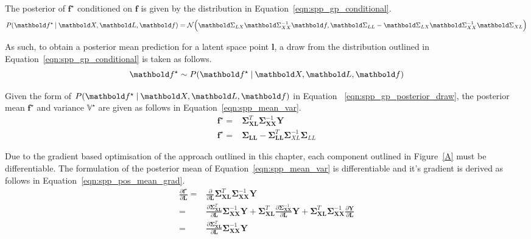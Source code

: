 The posterior of \( \bm{f}^{\star} \) conditioned on \( \bm{f} \) is given by
the distribution in Equation~\ref{eqn:spp_gp_conditional}.
\begin{equation}
  \label{eqn:spp_gp_conditional}
  P(\bm{f}^{\star} \given \bm{X}, \bm{L}, \bm{f}) = 
  \mathcal{N} \Big(
    \bm{\Sigma}_{LX} \bm{\Sigma}_{XX}^{-1} \bm{f}, 
    \bm{\Sigma}_{LL} - \bm{\Sigma}_{LX} \bm{\Sigma}_{XX}^{-1} \bm{\Sigma}_{XL}
  \Big) 
\end{equation}

As such, to obtain a posterior mean prediction for a latent space point \( \bm{l} \), 
a draw from the distribution outlined in Equation~\ref{eqn:spp_gp_conditional} is 
taken as follows.
\begin{equation}
  \label{eqn:spp_gp_posterior_draw}
  \bm{f}^{\star} \sim P(\bm{f}^{\star} \given \bm{X}, \bm{L}, \bm{f})
\end{equation}

Given the form of \( P(\bm{f}^{\star} \given \bm{X}, \bm{L}, \bm{f}) \) in Equation
~\ref{eqn:spp_gp_posterior_draw}, the posterior mean \( \bm{f}^{\star} \) and variance
\( \mathbb{V}^{\star} \) are given as follows in Equation~\ref{eqn:spp_mean_var}.
\begin{align}
  \label{eqn:spp_mean_var}
  \bm{f}^{\star} ={}& 
  \bm{\Sigma}_{\bm{XL}}^{T} \bm{\Sigma}_{\bm{XX}}^{-1} \bm{Y}\\
  \mathbb{\bm{f}^{\star}} ={}&
  \bm{\Sigma}_{\bm{LL}} - \bm{\Sigma}_{\bm{LL}}^{T} \bm{\Sigma}_{XL}^{-1} \bm{\Sigma}_{LL}
\end{align}

Due to the gradient based optimisation of the approach outlined in this chapter, each 
component outlined in Figure~\ref{A} must be differentiable. The formulation of the 
posterior mean of Equation~\ref{eqn:spp_mean_var} is differentiable and it's gradient 
is derived as follows in Equation~\ref{eqn:spp_pos_mean_grad}.
\begin{align}
  \label{eqn:spp_pos_mean_grad}
  \frac{\partial \bm{f}^{\star}}{\partial \bm{L}} ={}&
  \frac{\partial}{\partial \bm{L}}
  \bm{\Sigma}_{\bm{XL}}^{T} \bm{\Sigma}_{\bm{XX}}^{-1} \bm{Y}\\
  ={}& \frac{\partial \bm{\Sigma}_{\bm{XL}}^{T}}{\partial \bm{L}}
  \bm{\Sigma}_{\bm{XX}}^{-1} \bm{Y}
  + \bm{\Sigma}_{\bm{XL}}^{T} 
  \frac{\partial\bm{\Sigma}_{\bm{XX}}^{-1}}{\partial \bm{L}} \bm{Y}
  + \bm{\Sigma}_{\bm{XL}}^{T} \bm{\Sigma}_{\bm{XX}}^{-1} 
  \frac{\partial \bm{Y}}{\partial \bm{L}}\\
  ={}& \frac{\partial \bm{\Sigma}_{\bm{XL}}^{T}}{\partial \bm{L}}
  \bm{\Sigma}_{\bm{XX}}^{-1} \bm{Y}
\end{align}

